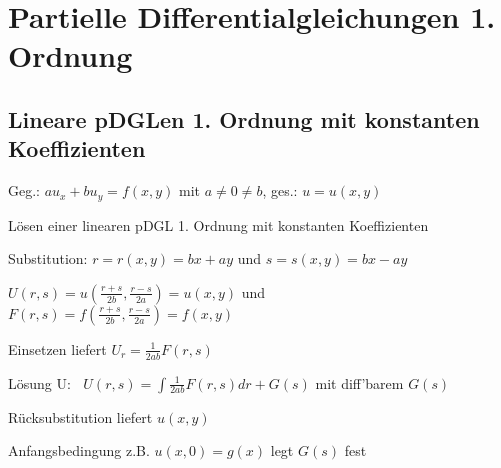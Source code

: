 \documentclass[german,color,5pt]{latex4ei/latex4ei_fs}
\begin{document}
\section{Partielle Differentialgleichungen 1. Ordnung}

\begin{sectionbox}
	\subsection{Lineare pDGLen 1. Ordnung mit konstanten Koeffizienten}
	Geg.: $a u_x+b u_y =f(x,y)$ mit $a \neq 0 \neq b$, ges.: $u=u(x,y)$
	\begin{cookbox}{Lösen einer linearen pDGL 1. Ordnung mit konstanten Koeffizienten}
		\item Substitution: $r=r(x,y)=bx+ay$ und $s=s(x,y)=bx-ay$
		\item $U(r,s) = u(\frac{r+s}{2b},\frac{r-s}{2a}) = u(x,y)$  und \\ $F(r,s) = f(\frac{r+s}{2b},\frac{r-s}{2a}) = f(x,y)$
		\item Einsetzen liefert $U_{r}=\frac{1}{2ab}F(r,s) $
		\item Lösung U: $\; \; U(r,s)=\int \frac{1}{2ab} F(r,s)dr+G(s)$ mit diff'barem $G(s)$
		\item Rücksubstitution liefert $u(x,y)$
		\item Anfangsbedingung z.B. $u(x,0) = g(x)$ legt $G(s)$ fest
	\end{cookbox}
\end{sectionbox}
\end{document}
